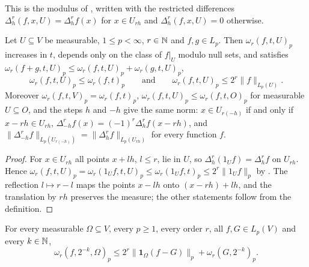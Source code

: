This is the modulus of \cite[(2.1)]{DeVoreSharpley}, written with the restricted differences
$\Delta_h^r(f, x, U) = \Delta_h^r f(x)$ for $x \in U_{rh}$ and $\Delta_h^r(f, x, U) = 0$ otherwise.

\begin{lemma}
\label{lem:rd-modulus-on}
\leanok
{}
Let $U \subseteq V$ be measurable, $1 \leq p < \infty$, $r \in \mathbb{N}$ and $f, g \in L_p$. Then
$\omega_r(f, t, U)_p$ increases in $t$, depends only on the class of $f|_U$ modulo null sets,
and satisfies $\omega_r(f + g, t, U)_p \leq \omega_r(f, t, U)_p + \omega_r(g, t, U)_p$,
\[
  \omega_r(f, t, U)_p \leq \omega_r(f, t)_p
  \qquad\text{and}\qquad
  \omega_r(f, t, U)_p \leq 2^r \|f\|_{L_p(U)} .
\]
Moreover $\omega_r(f, t, V)_p = \omega_r(f, t)_p$,
$\omega_r(f, t, U)_p \leq \omega_r(f, t, O)_p$ for measurable $U \subseteq O$, and the steps $h$
and $-h$ give the same norm: $x \in U_{r(-h)}$ if and only if $x - rh \in U_{rh}$,
$\Delta_{-h}^r f(x) = (-1)^r \Delta_h^r f(x - rh)$, and
$\|\Delta_{-h}^r f\|_{L_p(U_{r(-h)})} = \|\Delta_h^r f\|_{L_p(U_{rh})}$ for every function $f$.
\end{lemma}

\begin{proof}
\leanok
For $x \in U_{rh}$ all points $x + lh$, $l \leq r$, lie in $U$, so $\Delta_h^r (1_U f) = \Delta_h^r f$
on $U_{rh}$. Hence $\omega_r(f, t, U)_p = \omega_r(1_U f, t, U)_p \leq \omega_r(1_U f, t)_p \leq
2^r \|1_U f\|_p$ by . The reflection $l \mapsto r - l$ maps the points
$x - lh$ onto $(x - rh) + lh$, and the translation by $rh$ preserves the measure; the other
statements follow from the definition.
\end{proof}

\begin{lemma}
\label{lem:modulus-on-extension}
\leanok
{}
For every measurable $\Omega \subseteq V$, every $p \geq 1$, every order $r$, all
$f, G \in L_p(V)$ and every $k \in \mathbb{N}$,
\[
  \omega_r(f, 2^{-k}, \Omega)_p
    \leq 2^r \|\mathbf 1_\Omega (f - G)\|_p + \omega_r(G, 2^{-k})_p .
\]
\end{lemma}

